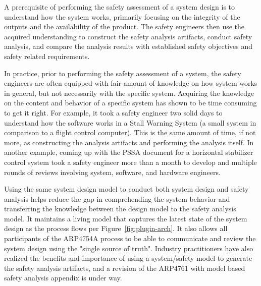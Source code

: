 A prerequisite of performing the safety assessment of a system design is to understand how the system works, primarily focusing on the integrity of the outputs and the availability of the product. The safety engineers then use the acquired understanding to construct the safety analysis artifacts, conduct safety analysis, and compare the analysis results with established safety objectives and safety related requirements. 

In practice, prior to performing the safety assessment of a system, the safety engineers are often equipped with fair amount of knowledge on how system works in general, but not necessarily with the specific system. Acquiring the knowledge on the content and behavior of a specific system has shown to be time consuming to get it right. For example, it took a safety engineer two solid days to understand how the software works in a Stall Warning System (a small system in comparison to a flight control computer). This is the same amount of time, if not more, as constructing the analysis artifacts and performing the analysis itself. In another example, coming up with the PSSA document for a horizontal stabilizer control system took a safety engineer more than a month to develop and multiple rounds of reviews involving system, software, and hardware engineers.

Using the same system design model to conduct both system design and safety analysis helps reduce the gap in comprehending the system behavior and transferring the knowledge between the design model to the safety analysis model. It maintains a living model that captures the latest state of the system design as the process flows per Figure~\ref{fig:plugin-arch}. It also allows all participants of the ARP4754A process to be able to communicate and review the system design using the "single source of truth". Industry practitioners have also realized the benefits and importance of using a system/safety model to generate the safety analysis artifacts, and a revision of the ARP4761 with model based safety analysis appendix is under way.




